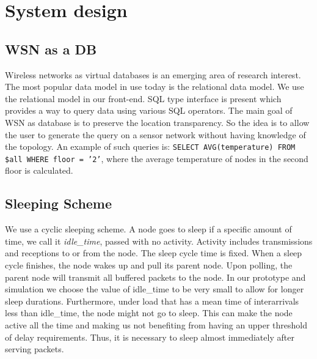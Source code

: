 \section{System design}\label{sec:design}

\subsection{WSN as a DB}
Wireless networks as virtual databases is an emerging area of research interest. The most popular data model in use today is the relational data model. We use the relational model in our front-end. SQL type interface is present which provides a way to query data using various SQL operators. The main goal of WSN as database is to preserve the location transparency. So the idea is to allow the user to generate the query on a sensor network without having knowledge of the topology. An example of such queries is: \texttt{SELECT AVG(temperature) FROM \$all WHERE floor = '2'}, where the average temperature of nodes in the second floor is calculated.

\subsection{Sleeping Scheme}
We use a cyclic sleeping scheme. A node goes to sleep if a specific amount of time, we call it \emph{idle\_time}, passed with no activity. Activity includes transmissions and receptions to or from the node. The sleep cycle time is fixed. When a sleep cycle finishes, the node wakes up and pull its parent node. Upon polling, the parent node will transmit all buffered packets to the node. In our prototype and simulation we choose the value of idle\_time to be very small to allow for longer sleep durations. Furthermore, under load that has a mean time of interarrivals less than idle\_time, the node might not go to sleep. This can make the node active all the time and making us not benefiting from having an upper threshold of delay requirements. Thus, it is necessary to sleep almost immediately after serving packets.

